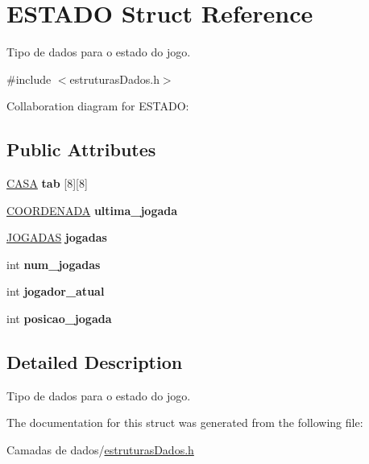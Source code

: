 \hypertarget{structESTADO}{}\section{E\+S\+T\+A\+DO Struct Reference}
\label{structESTADO}


Tipo de dados para o estado do jogo.  




{\ttfamily \#include $<$estruturas\+Dados.\+h$>$}



Collaboration diagram for E\+S\+T\+A\+DO\+:
\subsection*{Public Attributes}
\begin{DoxyCompactItemize}
\item 
\mbox{\label{structESTADO_ab56f0f1be16954d3768b4174d14c087d}} 
\hyperlink{estruturasDados_8h_aba91601f16d4c485b2d9b8c429f27039}{C\+A\+SA} {\bfseries tab} \mbox{[}8\mbox{]}\mbox{[}8\mbox{]}
\item 
\mbox{\label{structESTADO_a4896a5c5c1f40b43fb795623327e3f47}} 
\hyperlink{structCOORDENADA}{C\+O\+O\+R\+D\+E\+N\+A\+DA} {\bfseries ultima\+\_\+jogada}
\item 
\mbox{\label{structESTADO_afae43b87a488fad0f2b56a18bad31d18}} 
\hyperlink{estruturasDados_8h_a94c221d29a1760f008b7834093259b7d}{J\+O\+G\+A\+D\+AS} {\bfseries jogadas}
\item 
\mbox{\label{structESTADO_a261495728744647e618b4e623f5a4b7a}} 
int {\bfseries num\+\_\+jogadas}
\item 
\mbox{\label{structESTADO_a5dd28e2e68b7aef2b6b7ea88e02eff58}} 
int {\bfseries jogador\+\_\+atual}
\item 
\mbox{\label{structESTADO_a3bc6dcc01eba3b86a34e8437d432e90a}} 
int {\bfseries posicao\+\_\+jogada}
\end{DoxyCompactItemize}


\subsection{Detailed Description}
Tipo de dados para o estado do jogo. 

The documentation for this struct was generated from the following file\+:\begin{DoxyCompactItemize}
\item 
Camadas de dados/\hyperlink{estruturasDados_8h}{estruturas\+Dados.\+h}\end{DoxyCompactItemize}
